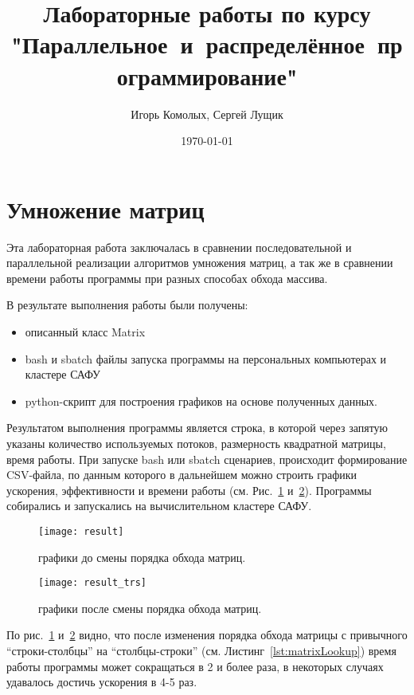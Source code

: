 \documentclass[13pt]{article}
\author{Игорь Комолых, Сергей Лущик}
\title{Лабораторные работы по курсу "Параллельное~и~распределённое~программирование"}
\date{\today}
\begin{document}
	\begin{titlepage}
		\maketitle
	\end{titlepage}
	
	\section{Умножение матриц}\label{sec:lab1}

	Эта лабораторная работа заключалась в сравнении последовательной и параллельной реализации алгоритмов умножения матриц,
	а так же в сравнении времени работы программы при разных способах обхода массива.

	В результате выполнения работы были получены:
	\begin{itemize}
		\item описанный класс Matrix
		\item bash и sbatch файлы запуска программы на персональных компьютерах и кластере САФУ
		\item python-скрипт для построения графиков на основе полученных данных.
 	\end{itemize}

	Результатом выполнения программы является строка, в которой через запятую указаны количество используемых потоков, размерность квадратной матрицы, время работы. При запуске bash или sbatch сценариев, происходит формирование CSV-файла, по данным которого в дальнейшем можно строить графики ускорения, эффективности и времени работы (см. Рис.~\ref{fig:beforeChange} и~\ref{fig:afterChange}). Программы собирались и запускались на вычислительном кластере САФУ.

	\begin{figure}[h]
		\centering
		\texttt{[image: result]}
		\caption{графики до смены порядка обхода матриц.}
		\label{fig:beforeChange} 
	\end{figure}

	\begin{figure}[h]
		\centering
		\texttt{[image: result\_trs]}
		\caption{графики после смены порядка обхода матриц.}
		\label{fig:afterChange} 
	\end{figure}

	По рис.~\ref{fig:beforeChange} и~\ref{fig:afterChange} видно, что после изменения порядка обхода матрицы с привычного ``строки-столбцы'' на ``столбцы-строки'' (см. Листинг~\ref{lst:matrixLookup}) время работы программы может сокращаться в 2 и более раза, в некоторых случаях удавалось достичь ускорения в 4-5 раз.
\end{document}
